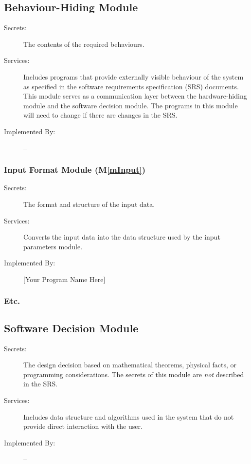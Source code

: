 \documentclass[12pt, titlepage]{article}
\newcommand{\mref}[1]{M\ref{#1}}
\begin{document}
\subsection{Behaviour-Hiding Module}
\begin{description}
\item[Secrets:]The contents of the required behaviours.
\item[Services:]Includes programs that provide externally visible behaviour of
  the system as specified in the software requirements specification (SRS)
  documents. This module serves as a communication layer between the
  hardware-hiding module and the software decision module. The programs in this
  module will need to change if there are changes in the SRS.
\item[Implemented By:] --
\end{description}


\subsubsection{Input Format Module (\mref{mInput})}
\begin{description}
\item[Secrets:]The format and structure of the input data.
\item[Services:]Converts the input data into the data structure used by the
  input parameters module.
\item[Implemented By:] [Your Program Name Here]
\end{description}


\subsubsection{Etc.}

\subsection{Software Decision Module}

\begin{description}
\item[Secrets:] The design decision based on mathematical theorems, physical
  facts, or programming considerations. The secrets of this module are
  \emph{not} described in the SRS.
\item[Services:] Includes data structure and algorithms used in the system that
  do not provide direct interaction with the user. 
\item[Implemented By:] --
\end{description}
\end{document}
